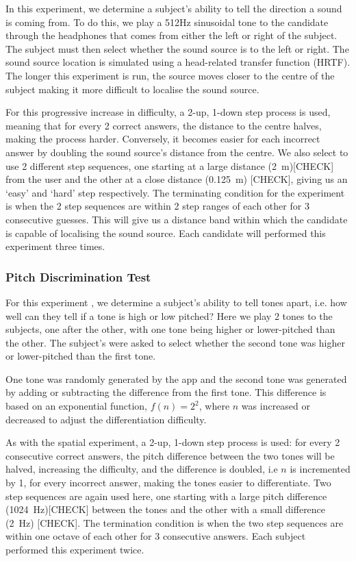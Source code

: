 \documentclass[format=sigconf, review=true, screen=true, anonymous=true]{acmart}
\begin{document}
In this experiment, we determine a subject's ability to tell the direction a sound is coming from. To do this, we play a 512Hz sinusoidal tone to the candidate through the headphones that comes from either the left or right of the subject. The subject must then select whether the sound source is to the left or right. The sound source location is simulated using a head-related transfer function (HRTF). The longer this experiment is run, the source moves closer to the centre of the subject making it more difficult to localise the sound source. 

For this progressive increase in difficulty, a 2-up, 1-down step process is used, meaning that for every 2 correct answers, the distance to the centre halves, making the process harder. Conversely, it becomes easier for each incorrect answer by doubling the sound source's distance from the centre. We also select to use 2 different step sequences, one starting at a large distance (\SI{2}{\m})[CHECK] from the user and the other at a close distance (\SI{0.125}{\m}) [CHECK], giving us an `easy' and `hard' step respectively. The terminating condition for the experiment is when the 2 step sequences are within 2 step ranges of each other for 3 consecutive guesses. This will give us a distance band within which the candidate is capable of localising the sound source. Each candidate will performed this experiment three times. 

\subsubsection{Pitch Discrimination Test}

For this experiment , we determine a subject's ability to tell tones apart, i.e. how well can they tell if a tone is high or low pitched? Here we play 2 tones to the subjects, one after the other, with one tone being higher or lower-pitched than the other. The subject's were asked to select whether the second tone was higher or lower-pitched than the first tone.

One tone was randomly generated by the app and the second tone was generated by adding or subtracting the difference from the first tone. This difference is based on an exponential function, $f(n) = 2^2$, where $n$ was increased or decreased to adjust the differentiation difficulty. 

As with the spatial experiment, a 2-up, 1-down step process is used: for every 2 consecutive correct answers, the pitch difference between the two tones will be halved, increasing the difficulty, and the difference is doubled, i.e $n$ is incremented by 1, for every incorrect answer, making the tones easier to differentiate. Two step sequences are again used here, one starting with a large pitch difference (\SI{1024}{\hertz})[CHECK] between the tones and the other with a small difference (\SI{2}{\hertz}) [CHECK]. The termination condition is when the two step sequences are within one octave of each other for 3 consecutive answers. Each subject performed this experiment twice. 
\end{document}
